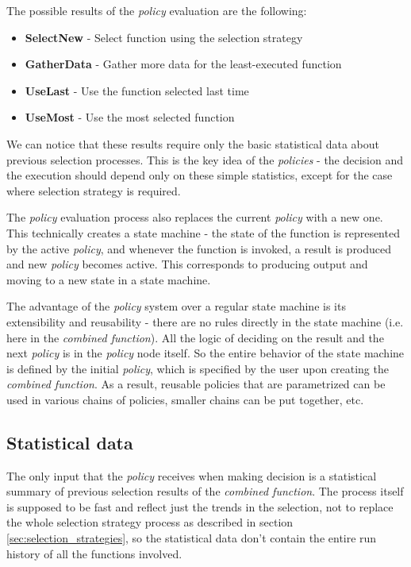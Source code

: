 The possible results of the \textit{policy} evaluation are the following:

\begin{itemize}
	\item \textbf{SelectNew} - Select function using the selection strategy
	\item \textbf{GatherData} - Gather more data for the least-executed function
	\item \textbf{UseLast} - Use the function selected last time
	\item \textbf{UseMost} - Use the most selected function
\end{itemize}

We can notice that these results require only the basic statistical data about previous selection processes. This is the key idea of the \textit{policies} - the decision and the execution should depend only on these simple statistics, except for the case where selection strategy is required.

The \textit{policy} evaluation process also replaces the current \textit{policy} with a new one. This technically creates a state machine - the state of the function is represented by the active \textit{policy}, and whenever the function is invoked, a result is produced and new \textit{policy} becomes active. This corresponds to producing output and moving to a new state in a state machine.

The advantage of the \textit{policy} system over a regular state machine is its extensibility and reusability - there are no rules directly in the state machine (i.e. here in the \textit{combined function}). All the logic of deciding on the result and the next \textit{policy} is in the \textit{policy} node itself. So the entire behavior of the state machine is defined by the initial \textit{policy}, which is specified by the user upon creating the \textit{combined function}. As a result, reusable policies that are parametrized can be used in various chains of policies, smaller chains can be put together, etc.

\subsection{Statistical data}

The only input that the \textit{policy} receives when making decision is a statistical summary of previous selection results of the \textit{combined function}. The process itself is supposed to be fast and reflect just the trends in the selection, not to replace the whole selection strategy process as described in section \ref{sec:selection_strategies}, so the statistical data don't contain the entire run history of all the functions involved.

